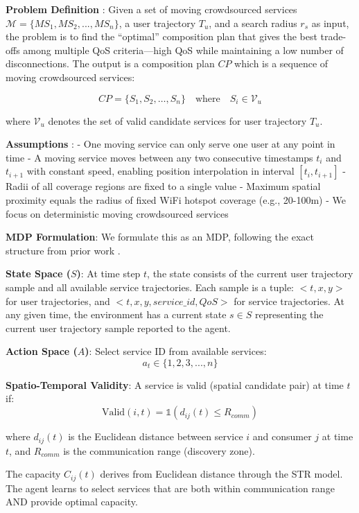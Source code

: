 \documentclass[10pt,twocolumn]{article}
\begin{document}
\textbf{Problem Definition} \cite{neiat2021}: Given a set of moving crowdsourced services
\(\mathcal{M} = \{MS_1, MS_2, ..., MS_n\}\), a user trajectory \(T_u\),
and a search radius \(r_s\) as input, the problem is to find the
``optimal'' composition plan that gives the best trade-offs among
multiple QoS criteria---high QoS while maintaining a low number of
disconnections. The output is a composition plan \(CP\) which is a
sequence of moving crowdsourced services:

\begin{equation*}
	CP = \{S_1, S_2, \ldots, S_n\} \quad \text{where} \quad S_i \in \mathcal{V}_u
\end{equation*}

\noindent where \(\mathcal{V}_u\) denotes the set of valid candidate
services for user trajectory \(T_u\).

\textbf{Assumptions} \cite{neiat2021}: - One moving service can only serve one user at
any point in time - A moving service moves between any two consecutive
timestamps \(t_i\) and \(t_{i+1}\) with constant speed, enabling
position interpolation in interval \([t_i, t_{i+1}]\) - Radii of all
coverage regions are fixed to a single value - Maximum spatial proximity
equals the radius of fixed WiFi hotspot coverage (e.g., 20-100m) - We
focus on deterministic moving crowdsourced services

\textbf{MDP Formulation}: We formulate this as an MDP, following the exact structure from prior work \cite{neiat2021}.

\textbf{State Space ($S$)}: At time step $t$, the state consists of the current user trajectory sample and all available service trajectories. Each sample is a tuple: $<t, x, y>$ for user trajectories, and $<t, x, y, service\_id, QoS>$ for service trajectories. At any given time, the environment has a current state $s \in S$ representing the current user trajectory sample reported to the agent.

\textbf{Action Space (\(A\))}: Select service ID from available
services: \[a_t \in \{1, 2, 3, ..., n\}\]

\textbf{Spatio-Temporal Validity}: A service is valid (spatial candidate
pair) at time \(t\) if:
\[\text{Valid}(i, t) = \mathbb{1}(d_{ij}(t) \leq R_{comm})\]

where \(d_{ij}(t)\) is the Euclidean distance between service \(i\) and
consumer \(j\) at time \(t\), and \(R_{comm}\) is the communication
range (discovery zone).

The capacity \(C_{ij}(t)\) derives from Euclidean distance through the
STR model. The agent learns to select services that are both within
communication range AND provide optimal capacity.
\end{document}
